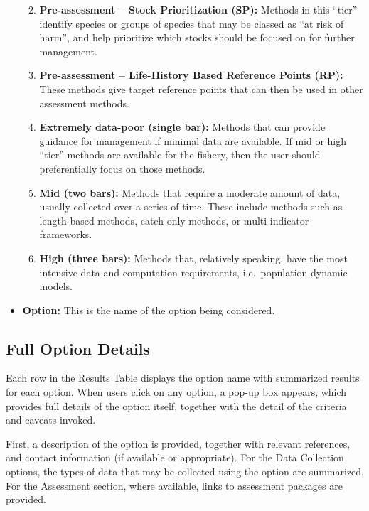 \documentclass[
  11pt,
]{book}
\begin{document}
\begin{itemize}
  \begin{enumerate}
  \def\labelenumi{\alph{enumi}.}
  \item
    \textbf{Pre-assessment -- Stock Prioritization (SP):} Methods in this ``tier'' identify species or groups of species that may be classed as ``at risk of harm'', and help prioritize which stocks should be focused on for further management.
  \item
    \textbf{Pre-assessment -- Life-History Based Reference Points (RP):} These methods give target reference points that can then be used in other assessment methods.
  \item
    \textbf{Extremely data-poor (single bar):} Methods that can provide guidance for management if minimal data are available. If mid or high ``tier'' methods are available for the fishery, then the user should preferentially focus on those methods.
  \item
    \textbf{Mid (two bars):} Methods that require a moderate amount of data, usually collected over a series of time. These include methods such as length-based methods, catch-only methods, or multi-indicator frameworks.
  \item
    \textbf{High (three bars):} Methods that, relatively speaking, have the most intensive data and computation requirements, i.e.~population dynamic models.
  \end{enumerate}
\item
  \textbf{Option:} This is the name of the option being considered.
\end{itemize}

\hypertarget{full-option-details}{%
\subsection{Full Option Details}\label{full-option-details}}

Each row in the Results Table displays the option name with summarized results for each option. When users click on any option, a pop-up box appears, which provides full details of the option itself, together with the detail of the criteria and caveats invoked.

First, a description of the option is provided, together with relevant references, and contact information (if available or appropriate). For the Data Collection options, the types of data that may be collected using the option are summarized. For the Assessment section, where available, links to assessment packages are provided.
\end{document}
